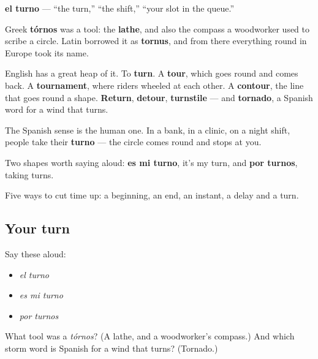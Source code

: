 \begin{cousinweb}
\textbf{el turno} — \textquotedblleft{}the turn,\textquotedblright{} \textquotedblleft{}the shift,\textquotedblright{} \textquotedblleft{}your slot in the queue.\textquotedblright{}

Greek \textbf{tórnos} was a tool: the \textbf{lathe}, and also the compass a woodworker used to scribe a circle. Latin borrowed it as \textbf{tornus}, and from there everything round in Europe took its name.

English has a great heap of it. To \textbf{turn}. A \textbf{tour}, which goes round and comes back. A \textbf{tournament}, where riders wheeled at each other. A \textbf{contour}, the line that goes round a shape. \textbf{Return}, \textbf{detour}, \textbf{turnstile} — and \textbf{tornado}, a Spanish word for a wind that turns.

The Spanish sense is the human one. In a bank, in a clinic, on a night shift, people take their \textbf{turno} — the circle comes round and stops at you.

Two shapes worth saying aloud: \textbf{es mi turno}, it's my turn, and \textbf{por turnos}, taking turns.
\end{cousinweb}

\begin{grammarlens}[title={What you've built}]
Five ways to cut time up: a beginning, an end, an instant, a delay and a turn.
\end{grammarlens}

\subsection*{Your turn}
Say these aloud:

\begin{itemize}
\raggedright
  \item \emph{el turno}
  \item \emph{es mi turno}
  \item \emph{por turnos}
\end{itemize}

\begin{tcolorbox}[breakable,colback=teal!4,colframe=teal!35!black,title={Before you move on}]
What tool was a \emph{tórnos}? (A lathe, and a woodworker's compass.) And which storm word is Spanish for a wind that turns? (Tornado.)
\end{tcolorbox}
